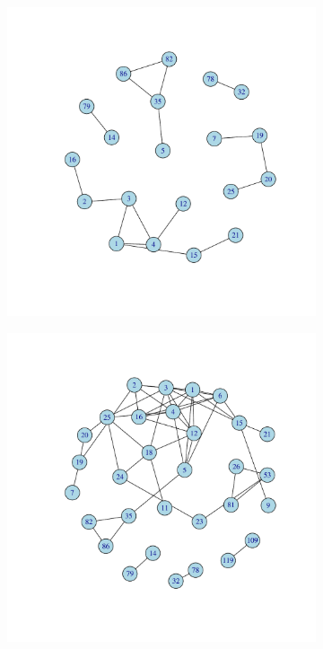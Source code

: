 \documentclass[12pt, oneside]{article}   	%
\begin{document}
\begin{figure}[H]
\centering
\begin{subfigure}[t]{0.48\textwidth}
\centering
\includegraphics[width=\linewidth]{fig7_overlapping_m.pdf}
\end{subfigure}
\hfill
\begin{subfigure}[t]{0.48\textwidth}
\centering
\includegraphics[width=\linewidth]{fig7_overlapping_k.pdf} 

\end{subfigure}
\end{figure}
\end{document}
